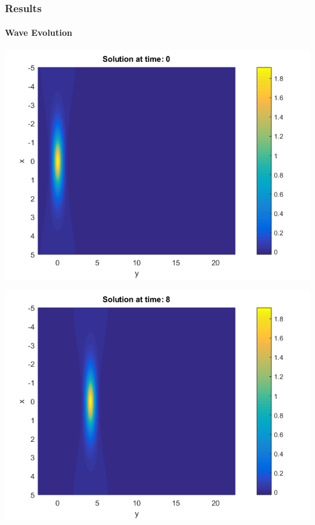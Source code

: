 \documentclass{beamer}
\begin{document}
\begin{frame}
\frametitle{Results}
\framesubtitle{Wave Evolution}
\begin{center}\vspace{0.4cm}
	\begin{minipage}[b]{0.30\linewidth}
		\includegraphics[width=\linewidth]{figures/Solution_bt3_t=0.png}
	\end{minipage}	
	\begin{minipage}[b]{0.30\linewidth}
		\includegraphics[width=\linewidth]{figures/Solution_bt3_t=8.png}
	\end{minipage}	
	\begin{minipage}[b]{0.30\linewidth}

\end{minipage}
\end{center}
\end{frame}
\end{document}

